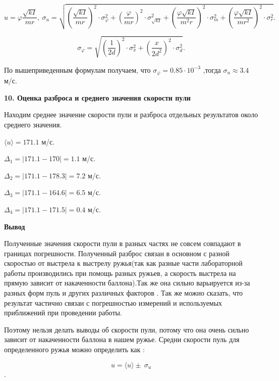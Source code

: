 \documentclass[a4paper,12pt]{article} %
\begin{document}
\[u = \varphi \frac{\sqrt{kI}}{mr},\ \sigma_u = \sqrt{(\frac{\sqrt{kI}}{mr})^2\cdot \sigma_{\varphi}^2 + (\frac{\varphi}{mr})^2\cdot \sigma_{\sqrt{kI}}^2 + (\frac{\varphi \sqrt{kI}}{m^2r})^2\cdot \sigma_{m}^2    + (\frac{\varphi \sqrt{kI}}{mr^2})^2\cdot \sigma_{r}^2 }.\]

\[ \sigma_{\varphi} = \sqrt{ (\frac{1}{2d})^2\cdot \sigma_x^2 +(\frac{x}{2d^2})^2\cdot \sigma_d^2 }  .\]
 
По вышеприведенным формулам получаем, что $\sigma_{\varphi} = 0.85 \cdot 10^{-3}$ ,тогда $ \sigma_u \approx 3.4$ м/с.
\newpage
\begin{center}
{\bf 10. Оценка разброса и среднего значения скорости пули}
\end{center}

Находим среднее значение скорости пули и разброса отдельных результатов около среднего значения.

$\langle u\rangle = 171.1$ м/с.

$\Delta_1 = |171.1 - 170| = 1.1$ м/с.

$\Delta_2 = |171.1 - 178.3| = 7.2$ м/с.

$\Delta_3 = |171.1 - 164.6| = 6.5$ м/с.

$\Delta_4 = |171.1 - 171.5| = 0.4$ м/с.

{\bf Вывод}

Полученные значения скорости пули в разных частях не совсем совпадают в границах погрешности. Полученный разброс связан в основном с разной скоростью от выстрела к выстрелу ружья(так как разные части лабораторной работы производились при помощь разных ружьев, а скорость выстрела на прямую зависит от накаченности баллона).Так же она сильно варьируется из-за разных форм пуль и других различных факторов . Так же можно сказать, что результат частично связан с погрешностью измерений и используемых приближений при проведении работы.

Поэтому нельзя делать выводы об скорости пули, потому что она очень сильно зависит от накаченности баллона в нашем ружье. Средни скорости пуль для определенного ружья  можно определить как :

\[u = \langle u\rangle \pm\ \sigma_u\].
\end{document}

